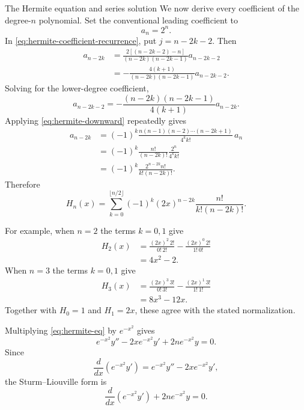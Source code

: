 \documentclass[11pt]{beamer}
\begin{document}
\begin{frame}[allowframebreaks]{The Hermite equation and series solution}
We now derive every coefficient of the degree-$n$ polynomial. Set the conventional leading
coefficient to
\[
  a_n=2^n.
\]
In \eqref{eq:hermite-coefficient-recurrence}, put $j=n-2k-2$. Then
\begin{align*}
  a_{n-2k}
  &=\frac{2[(n-2k-2)-n]}{(n-2k)(n-2k-1)}a_{n-2k-2}\\
  &=-\frac{4(k+1)}{(n-2k)(n-2k-1)}a_{n-2k-2}.
\end{align*}
Solving for the lower-degree coefficient,
\begin{equation}
  a_{n-2k-2}
  =-\frac{(n-2k)(n-2k-1)}{4(k+1)}a_{n-2k}.
  \label{eq:hermite-downward}
\end{equation}
Applying \eqref{eq:hermite-downward} repeatedly gives
\begin{align*}
  a_{n-2k}
  &=(-1)^k
    \frac{n(n-1)(n-2)\cdots(n-2k+1)}{4^k k!}\,a_n\\
  &=(-1)^k\frac{n!}{(n-2k)!}\frac{2^n}{4^k k!}\\
  &=(-1)^k\frac{2^{n-2k}n!}{k!(n-2k)!}.
\end{align*}
Therefore
\begin{equation}
  H_n(x)=\sum_{k=0}^{\lfloor n/2\rfloor}
  (-1)^k(2x)^{n-2k}\frac{n!}{k!(n-2k)!}.
  \label{eq:hermite-series}
\end{equation}

For example, when $n=2$ the terms $k=0,1$ give
\begin{align*}
  H_2(x)
  &=\frac{(2x)^2\,2!}{0!\,2!}
    -\frac{(2x)^0\,2!}{1!\,0!}\\
  &=4x^2-2.
\end{align*}
When $n=3$ the terms $k=0,1$ give
\begin{align*}
  H_3(x)
  &=\frac{(2x)^3\,3!}{0!\,3!}
    -\frac{(2x)^1\,3!}{1!\,1!}\\
  &=8x^3-12x.
\end{align*}
Together with $H_0=1$ and $H_1=2x$, these agree with the stated normalization.

Multiplying \eqref{eq:hermite-eq} by $e^{-x^2}$ gives
\[
  e^{-x^2}y''-2xe^{-x^2}y'+2ne^{-x^2}y=0.
\]
Since
\[
  \frac{d}{dx}\!\left(e^{-x^2}y'\right)
  =e^{-x^2}y''-2xe^{-x^2}y',
\]
the Sturm--Liouville form is
\begin{equation}
  \frac{d}{dx}\!\left(e^{-x^2}y'\right)
  +2n e^{-x^2}y=0.
  \label{eq:hermite-sl}
\end{equation}


\end{frame}
\end{document}
